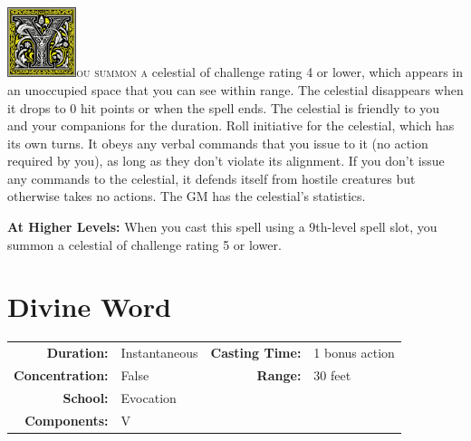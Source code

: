 \documentclass[12pt,showtrims]{memoir}
\begin{document}
\vspace{1\baselineskip}\noindent
\lettrine[lines=4]{\includegraphics[height=58pt]{initials/Y.png}}{ou summon a} celestial of challenge rating 4 or lower, which appears in an unoccupied space that you can see within range. The celestial disappears when it drops to 0 hit points or when the spell ends. The celestial is friendly to you and your companions for the duration. Roll initiative for the celestial, which has its own turns. It obeys any verbal commands that you issue to it (no action required by you), as long as they don't violate its alignment. If you don't issue any commands to the celestial, it defends itself from hostile creatures but otherwise takes no actions. The GM has the celestial's statistics.

\vspace{8pt} \noindent\textbf{At Higher Levels:} When you cast this spell using a 9th-level spell slot, you summon a celestial of challenge rating 5 or lower.
\newpage
\section*{Divine Word}

{
\small\centering\vspace{-6pt}
\begin{tabular}{rlrl}
\toprule

\textbf{Duration:} & Instantaneous &
\textbf{Casting Time:} & 1 bonus action \\
\textbf{Concentration:} & False &
\textbf{Range:} & 30 feet \\
\textbf{School:} & Evocation \\
\textbf{Components:} & \multicolumn{3}{p{0.7\textwidth}}{V}\\

\bottomrule
\end{tabular}
}
\end{document}

